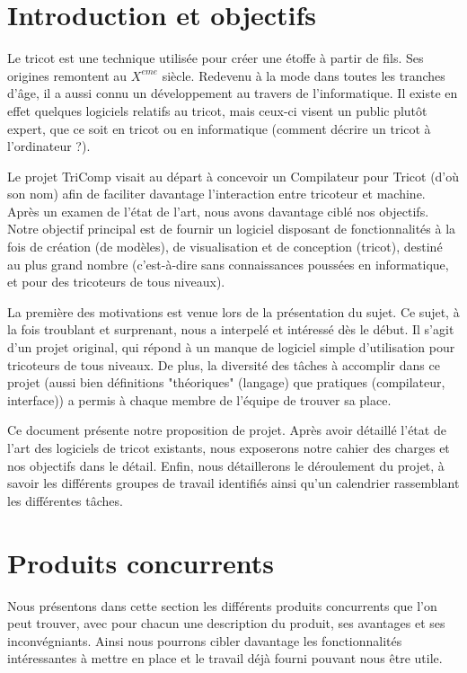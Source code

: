 \documentclass{article}
\begin{document}
\section{Introduction et objectifs}

Le tricot est une technique utilisée pour créer une étoffe à partir de fils. Ses origines remontent au $X^{eme}$ siècle.
Redevenu à la mode dans toutes les tranches d'âge, il a aussi connu un développement au travers de l'informatique. Il existe en effet
quelques logiciels relatifs au tricot, mais ceux-ci visent un public plutôt expert, que ce soit en tricot ou en informatique (comment
décrire un tricot à l'ordinateur ?).

Le projet TriComp visait au départ à concevoir un Compilateur pour Tricot (d'où son nom) afin de faciliter davantage l'interaction entre
tricoteur et machine. Après un examen de l'état de l'art, nous avons davantage ciblé nos objectifs. Notre objectif principal est de
fournir un logiciel disposant de fonctionnalités à la fois de création (de modèles), de visualisation et de conception (tricot),
destiné au plus grand nombre (c'est-à-dire sans connaissances poussées en informatique, et pour des tricoteurs de tous niveaux).

La première des motivations est venue lors de la présentation du sujet. Ce sujet, à la fois troublant et surprenant, nous a interpelé et 
intéressé dès le début. Il s'agit d'un projet original, qui répond à un manque de logiciel simple d'utilisation pour tricoteurs de tous
niveaux. De plus, la diversité des tâches à accomplir dans ce projet (aussi bien définitions "théoriques" (langage) que pratiques 
(compilateur, interface)) a permis à chaque membre de l'équipe de trouver sa place.

Ce document présente notre proposition de projet. Après avoir détaillé l'état de l'art des logiciels de tricot existants, nous exposerons
notre cahier des charges et nos objectifs dans le détail. Enfin, nous détaillerons le déroulement du projet, à savoir les différents
groupes de travail identifiés ainsi qu'un calendrier rassemblant les différentes tâches.

\tableofcontents
\section{Produits concurrents}

Nous présentons dans cette section les différents produits concurrents que l'on peut trouver, avec pour chacun une description du produit, 
ses avantages et ses inconvégniants. Ainsi nous pourrons cibler davantage les fonctionnalités intéressantes à mettre en place et le 
travail déjà fourni pouvant nous être utile.
\end{document}
